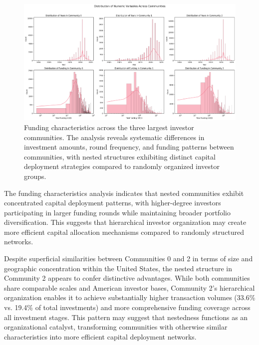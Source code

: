
\begin{figure}[htbp]
\centering
\includegraphics[width=1\textwidth]{./assets/funding-characteristics.png}
\caption{Funding characteristics across the three largest investor communities. The analysis reveals systematic differences in investment amounts, round frequency, and funding patterns between communities, with nested structures exhibiting distinct capital deployment strategies compared to randomly organized investor groups.}
\label{fig:funding_characteristics}
\end{figure}


The funding characteristics analysis indicates that nested communities exhibit concentrated capital deployment patterns, with higher-degree investors participating in larger funding rounds while maintaining broader portfolio diversification. This suggests that hierarchical investor organization may create more efficient capital allocation mechanisms compared to randomly structured networks.

Despite superficial similarities between Communities 0 and 2 in terms of size and geographic concentration within the United States, the nested structure in Community 2 appears to confer distinctive advantages. While both communities share comparable scales and American investor bases, Community 2's hierarchical organization enables it to achieve substantially higher transaction volumes (33.6\% vs. 19.4\% of total investments) and more comprehensive funding coverage across all investment stages. This pattern may suggest that nestedness functions as an organizational catalyst, transforming communities with otherwise similar characteristics into more efficient capital deployment networks.

